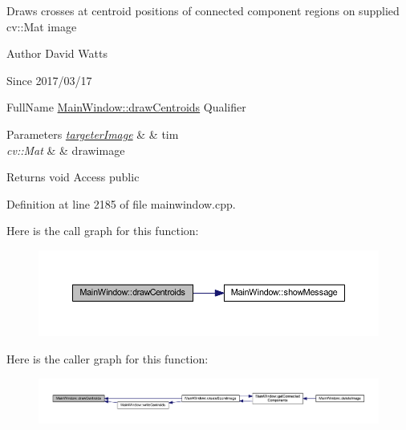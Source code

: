 Draws crosses at centroid positions of connected component regions on supplied cv\+::\+Mat image

\begin{DoxyAuthor}{Author}
David Watts 
\end{DoxyAuthor}
\begin{DoxySince}{Since}
2017/03/17
\end{DoxySince}
Full\+Name \hyperlink{class_main_window_ad68b6789cc86ef20cd7cedd6de8d4ed2}{Main\+Window\+::draw\+Centroids} Qualifier 
\begin{DoxyParams}{Parameters}
{\em \hyperlink{classtargeter_image}{targeter\+Image}} & \& tim \\
\hline
{\em cv\+::\+Mat} & \& drawimage \\
\hline
\end{DoxyParams}
\begin{DoxyReturn}{Returns}
void Access public 
\end{DoxyReturn}


Definition at line 2185 of file mainwindow.\+cpp.

Here is the call graph for this function\+:
\nopagebreak
\begin{figure}[H]
\begin{center}
\leavevmode
\includegraphics[width=350pt]{class_main_window_ad68b6789cc86ef20cd7cedd6de8d4ed2_cgraph}
\end{center}
\end{figure}
Here is the caller graph for this function\+:
\nopagebreak
\begin{figure}[H]
\begin{center}
\leavevmode
\includegraphics[width=350pt]{class_main_window_ad68b6789cc86ef20cd7cedd6de8d4ed2_icgraph}
\end{center}
\end{figure}
\mbox{\label{class_main_window_a1e798fdae21c3294495ea7994df1887a}} 
